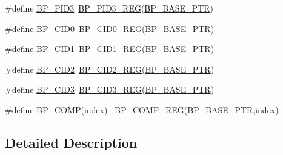 \begin{DoxyCompactItemize}
\item 
\#define \hyperlink{group___b_p___register___accessor___macros_ga0a00491adb1eb94a135e34890caf06d9}{B\+P\+\_\+\+P\+I\+D3}~\hyperlink{group___b_p___register___accessor___macros_gab274b1e1848f9a6b4dcda2fb35b4db43}{B\+P\+\_\+\+P\+I\+D3\+\_\+\+R\+EG}(\hyperlink{group___b_p___peripheral_ga375cd6d2e7ec414f4e33cb54d5494940}{B\+P\+\_\+\+B\+A\+S\+E\+\_\+\+P\+TR})
\item 
\#define \hyperlink{group___b_p___register___accessor___macros_gac554c0442a617d13f84c95af8faf9a11}{B\+P\+\_\+\+C\+I\+D0}~\hyperlink{group___b_p___register___accessor___macros_ga732a82c01b34e9b81bb0a4ee7ed32576}{B\+P\+\_\+\+C\+I\+D0\+\_\+\+R\+EG}(\hyperlink{group___b_p___peripheral_ga375cd6d2e7ec414f4e33cb54d5494940}{B\+P\+\_\+\+B\+A\+S\+E\+\_\+\+P\+TR})
\item 
\#define \hyperlink{group___b_p___register___accessor___macros_ga25e9b4026009629d703d5463baa85695}{B\+P\+\_\+\+C\+I\+D1}~\hyperlink{group___b_p___register___accessor___macros_gad04edd6fa092ee8e9af1f2a14f8af779}{B\+P\+\_\+\+C\+I\+D1\+\_\+\+R\+EG}(\hyperlink{group___b_p___peripheral_ga375cd6d2e7ec414f4e33cb54d5494940}{B\+P\+\_\+\+B\+A\+S\+E\+\_\+\+P\+TR})
\item 
\#define \hyperlink{group___b_p___register___accessor___macros_gabe4f49fd630b67a0ba0e58b37fb78c58}{B\+P\+\_\+\+C\+I\+D2}~\hyperlink{group___b_p___register___accessor___macros_ga8a5d96d6c0996bf1023029216b5f1249}{B\+P\+\_\+\+C\+I\+D2\+\_\+\+R\+EG}(\hyperlink{group___b_p___peripheral_ga375cd6d2e7ec414f4e33cb54d5494940}{B\+P\+\_\+\+B\+A\+S\+E\+\_\+\+P\+TR})
\item 
\#define \hyperlink{group___b_p___register___accessor___macros_gaa9964a6a353ac63f76306563fda7b188}{B\+P\+\_\+\+C\+I\+D3}~\hyperlink{group___b_p___register___accessor___macros_ga70b01e1f6db4f81c8b2111f0f7998ed5}{B\+P\+\_\+\+C\+I\+D3\+\_\+\+R\+EG}(\hyperlink{group___b_p___peripheral_ga375cd6d2e7ec414f4e33cb54d5494940}{B\+P\+\_\+\+B\+A\+S\+E\+\_\+\+P\+TR})
\item 
\#define \hyperlink{group___b_p___register___accessor___macros_ga3fe8478642c163af7fcf732b96227f76}{B\+P\+\_\+\+C\+O\+MP}(index)                                                  ~\hyperlink{group___b_p___register___accessor___macros_ga4efaa53ceb479c2ccba63e6f46db3859}{B\+P\+\_\+\+C\+O\+M\+P\+\_\+\+R\+EG}(\hyperlink{group___b_p___peripheral_ga375cd6d2e7ec414f4e33cb54d5494940}{B\+P\+\_\+\+B\+A\+S\+E\+\_\+\+P\+TR},index)
\end{DoxyCompactItemize}


\subsection{Detailed Description}


